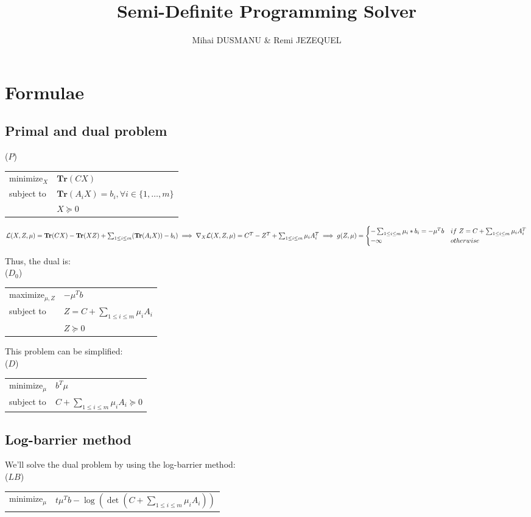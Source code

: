 \documentclass{article}
\title{Semi-Definite Programming Solver}
\author{Mihai DUSMANU \& Remi JEZEQUEL}
\begin{document}
	
\maketitle

\section{Formulae}

\subsection{Primal and dual problem}

($P$)\begin{tabular}{l l}
	minimize$_{X}$ & $\mathbf{Tr}(C X)$ \\
	subject to & $\mathbf{Tr}(A_i X) = b_i, \forall i \in \{1, \dots, m\}$ \\
	& $X \succeq 0$  
\end{tabular}

$\mathcal{L}(X, Z, \mu) = \mathbf{Tr}(C X) - \mathbf{Tr}(X Z) + \sum_{1 \leq i \leq m} (\mathbf{Tr}(A_i X)) - b_i) \\
\implies \nabla_X \mathcal{L}(X, Z, \mu) = C^T - Z^T + \sum_{1 \leq i \leq m} \mu_i A_i^T \\
\implies g(Z, \mu) = \begin{cases}
- \sum_{1 \leq i \leq m} \mu_i * b_i = - \mu^T b & if\ Z = C + \sum_{1 \leq i \leq m} \mu_i A_i^T \\ 
- \infty & otherwise 
\end{cases}$

Thus, the dual is: \\
($D_0$)\begin{tabular}{l l}
	maximize$_{\mu, Z}$ & $- \mu^T b$ \\
	subject to & $Z = C + \sum_{1 \leq i \leq m} \mu_i A_i$ \\
	& $Z \succeq 0$
\end{tabular}

This problem can be simplified: \\
($D$)\begin{tabular}{l l}
	minimize$_{\mu}$ & $b^T \mu$ \\
	subject to & $C + \sum_{1 \leq i \leq m} \mu_i A_i \succeq 0$
\end{tabular}

\subsection{Log-barrier method}
We'll solve the dual problem by using the log-barrier method: \\
($LB$)\begin{tabular}{l l}
	minimize$_{\mu}$ & $t \mu^T b - \log(\det(C + \sum_{1 \leq i \leq m} \mu_i A_i))$
\end{tabular}
\end{document}
